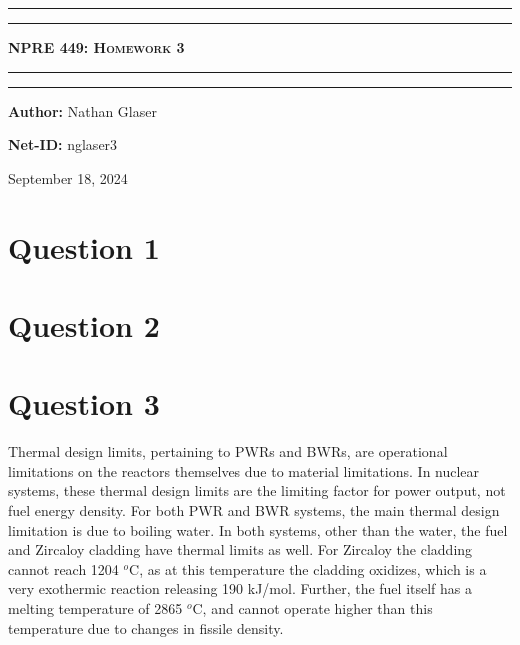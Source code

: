 \documentclass{article}
\begin{document}
\begin{titlepage}

\centering
\scshape
\vspace{\baselineskip}

%
\rule{\textwidth}{1.6pt}\vspace*{-\baselineskip}\vspace*{2pt}
\rule{\textwidth}{0.4pt}

{\Huge \textbf{\textsc{NPRE 449: Homework 3 \\
\vspace{15pt}}}}

\rule{\textwidth}{0.4pt}\vspace*{-\baselineskip}\vspace{3.2pt}
\rule{\textwidth}{1.6pt}\vspace{6pt}
\vspace{1.5\baselineskip}


\large \centerline{\textbf{Author:} Nathan Glaser}
\large \centerline{\textbf{Net-ID:} nglaser3}
\quad

\vfill
\large \centerline{September 18, 2024}
%
\end{titlepage}

\tableofcontents
\newpage
{}

\section*{Question 1}


\section*{Question 2}

\section*{Question 3}

Thermal design limits, pertaining to PWRs and BWRs, are operational limitations on the reactors themselves due to material limitations. In nuclear systems, these thermal design limits are the limiting factor for power output, not fuel energy density. For both PWR and BWR systems, the main thermal design limitation is due to boiling water.  In both systems, other than the water, the fuel and Zircaloy cladding have thermal limits as well. For Zircaloy the cladding cannot reach 1204 $^o$C, as at this temperature the cladding oxidizes, which is a very exothermic reaction releasing 190 kJ/mol. Further, the fuel itself has a melting temperature of 2865 $^o$C, and cannot operate higher than this temperature due to changes in fissile density.  
\end{document}
